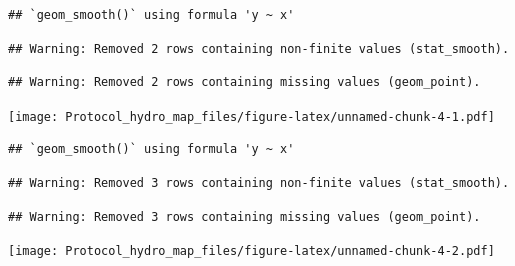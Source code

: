 \documentclass[]{article}
\newenvironment{Shaded}{\begin{snugshade}}{\end{snugshade}}
\newcommand{\KeywordTok}[1]{\textcolor[rgb]{0.13,0.29,0.53}{\textbf{#1}}}
\newcommand{\DataTypeTok}[1]{\textcolor[rgb]{0.13,0.29,0.53}{#1}}
\newcommand{\StringTok}[1]{\textcolor[rgb]{0.31,0.60,0.02}{#1}}
\newcommand{\OperatorTok}[1]{\textcolor[rgb]{0.81,0.36,0.00}{\textbf{#1}}}
\newcommand{\NormalTok}[1]{#1}
\begin{document}
\begin{verbatim}
## `geom_smooth()` using formula 'y ~ x'
\end{verbatim}

\begin{verbatim}
## Warning: Removed 2 rows containing non-finite values (stat_smooth).
\end{verbatim}

\begin{verbatim}
## Warning: Removed 2 rows containing missing values (geom_point).
\end{verbatim}

\texttt{[image: Protocol\_hydro\_map\_files/figure-latex/unnamed-chunk-4-1.pdf]}

\begin{Shaded}
\end{Shaded}

\begin{verbatim}
## `geom_smooth()` using formula 'y ~ x'
\end{verbatim}

\begin{verbatim}
## Warning: Removed 3 rows containing non-finite values (stat_smooth).
\end{verbatim}

\begin{verbatim}
## Warning: Removed 3 rows containing missing values (geom_point).
\end{verbatim}

\texttt{[image: Protocol\_hydro\_map\_files/figure-latex/unnamed-chunk-4-2.pdf]}

\begin{Shaded}
\end{Shaded}
\end{document}
